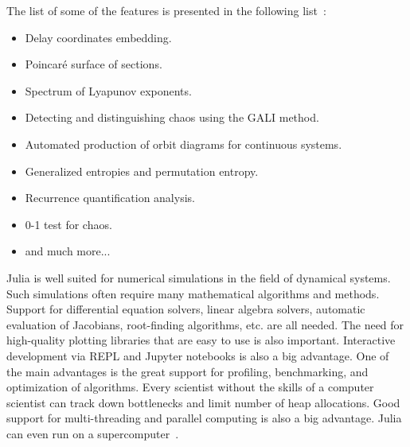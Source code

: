 \par
The list of some of the features is presented in the following list~\cite{DynamicalSystems2024}:
\begin{itemize}
    \item Delay coordinates embedding.
    \item Poincaré surface of sections.
    \item Spectrum of Lyapunov exponents.
    \item Detecting and distinguishing chaos using the GALI method.
    \item Automated production of orbit diagrams for continuous systems.
    \item Generalized entropies and permutation entropy.
    \item Recurrence quantification analysis.
    \item 0-1 test for chaos.
    \item and much more...
\end{itemize}

\par
Julia is well suited for numerical simulations in the field of dynamical systems.
Such simulations often require many mathematical algorithms and methods.
Support for differential equation solvers, linear algebra solvers, automatic evaluation of Jacobians, root-finding algorithms, etc. are all needed.
The need for high-quality plotting libraries that are easy to use is also important.
Interactive development via REPL and Jupyter notebooks is also a big advantage.
One of the main advantages is the great support for profiling, benchmarking, and optimization of algorithms.
Every scientist without the skills of a computer scientist can track down bottlenecks and limit number of heap allocations.
Good support for multi-threading and parallel computing is also a big advantage.
Julia can even run on a supercomputer~\cite{Regier2016-vq}.

